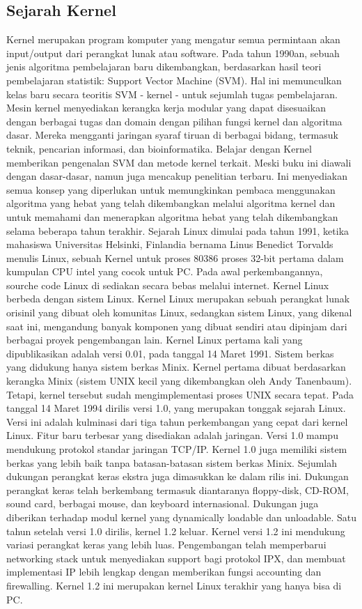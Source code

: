 \subsection{Sejarah Kernel}
Kernel merupakan program komputer yang mengatur semua permintaan akan input/output dari perangkat lunak atau software.
Pada tahun 1990an, sebuah jenis algoritma pembelajaran baru dikembangkan, berdasarkan hasil teori pembelajaran statistik: Support Vector Machine (SVM). 
Hal ini memunculkan kelas baru secara teoritis SVM - kernel - untuk sejumlah tugas pembelajaran. 
Mesin kernel menyediakan kerangka kerja modular yang dapat disesuaikan dengan berbagai tugas dan domain dengan pilihan fungsi kernel dan algoritma dasar. 
Mereka mengganti jaringan syaraf tiruan di berbagai bidang, termasuk teknik, pencarian informasi, dan bioinformatika.
Belajar dengan Kernel memberikan pengenalan SVM dan metode kernel terkait. Meski buku ini diawali dengan dasar-dasar, namun juga mencakup penelitian terbaru. 
Ini menyediakan semua konsep yang diperlukan untuk memungkinkan pembaca menggunakan algoritma yang hebat yang telah dikembangkan melalui algoritma kernel dan untuk memahami dan menerapkan algoritma hebat yang telah dikembangkan selama beberapa tahun terakhir.
Sejarah Linux dimulai pada tahun 1991, ketika mahasiswa Universitas Helsinki, Finlandia bernama Linus Benedict Torvalds menulis Linux, sebuah Kernel untuk proses 80386
proses 32-bit pertama dalam kumpulan CPU intel yang cocok untuk PC.
Pada awal perkembangannya, sourche code Linux di sediakan secara bebas melalui internet. Kernel Linux berbeda dengan sistem Linux. Kernel Linux merupakan sebuah perangkat lunak
orisinil yang dibuat oleh komunitas Linux, sedangkan sistem Linux, yang dikenal saat ini, mengandung banyak komponen yang dibuat sendiri atau dipinjam dari berbagai proyek pengembangan lain.
Kernel Linux pertama kali yang dipublikasikan adalah versi 0.01, pada tanggal 14 Maret 1991. Sistem berkas yang didukung hanya sistem berkas Minix. Kernel pertama dibuat berdasarkan
kerangka Minix (sistem UNIX kecil yang dikembangkan oleh Andy Tanenbaum). Tetapi, kernel tersebut sudah mengimplementasi proses UNIX secara tepat.
Pada tanggal 14 Maret 1994 dirilis versi 1.0, yang merupakan tonggak sejarah Linux. Versi ini adalah kulminasi dari tiga tahun perkembangan yang cepat dari kernel Linux. Fitur baru terbesar
yang disediakan adalah jaringan. Versi 1.0 mampu mendukung protokol standar jaringan TCP/IP. Kernel 1.0 juga memiliki sistem berkas yang lebih baik tanpa batasan-batasan sistem berkas Minix.
Sejumlah dukungan perangkat keras ekstra juga dimasukkan ke dalam rilis ini. Dukungan perangkat keras telah berkembang termasuk diantaranya floppy-disk, CD-ROM, sound card, berbagai mouse,
dan keyboard internasional. Dukungan juga diberikan terhadap modul kernel yang dynamically loadable dan unloadable.
Satu tahun setelah versi 1.0 dirilis, kernel 1.2 keluar. Kernel versi 1.2 ini mendukung variasi perangkat keras yang lebih luas. Pengembangan telah memperbarui networking stack untuk menyediakan
support bagi protokol IPX, dan membuat implementasi IP lebih lengkap dengan memberikan fungsi accounting dan firewalling. Kernel 1.2 ini merupakan kernel Linux terakhir yang hanya bisa di PC. 

